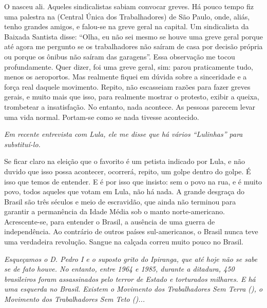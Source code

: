 \normalfont 
O  nasceu ali. Aqueles sindicalistas sabiam convocar
greves. Há pouco tempo fiz uma palestra na  (Central Única dos
Trabalhadores) de São Paulo, onde, aliás, tenho grandes amigos, e
falou-se na greve geral na capital. Um sindicalista da Baixada Santista
disse: ``Olha, eu não sei mesmo se houve uma greve geral porque até
agora me pergunto se os trabalhadores não saíram de casa por decisão
própria ou porque os ônibus não saíram das garagens''. Essa observação
me tocou profundamente. Quer dizer, foi uma greve geral, sim: parou
praticamente tudo, menos os aeroportos. Mas realmente fiquei em dúvida
sobre a sinceridade e a força real daquele movimento. Repito, não
escasseiam razões para fazer greves gerais, e muito mais que isso, para
realmente mostrar o protesto, exibir a queixa, trombetear a
insatisfação. No entanto, nada acontece. As pessoas parecem levar uma
vida normal. Portam-se como se nada tivesse acontecido.

\itshape
Em recente entrevista com Lula, ele me disse que há
vários ``Lulinhas'' para substituí-lo.

\normalfont 
Se ficar claro na eleição que o favorito é um petista
indicado por Lula, e não duvido que isso possa acontecer, ocorrerá,
repito, um golpe dentro do golpe. É isso que temos de entender. E é por
isso que insisto: sem o povo na rua, e é muito povo, todos aqueles que
votam em Lula, não há nada. A grande desgraça do Brasil são três séculos
e meio de escravidão, que ainda não terminou para garantir a permanência
da Idade Média sob o manto norte-americano. Acrescente-se, para entender
o Brasil, a ausência de uma guerra de independência. Ao contrário de
outros países sul-americanos, o Brasil nunca teve uma verdadeira
revolução. Sangue na calçada correu muito pouco no Brasil.

\itshape
Esqueçamos o D. Pedro I e o suposto grito do Ipiranga,
que até hoje não se sabe se de fato houve. No entanto, entre 1964 e
1985, durante a ditadura, 450 brasileiros foram assassinados pelo terror
de Estado e torturados milhares. E há uma esquerda no Brasil. Existem o
Movimento dos Trabalhadores Sem Terra (), o Movimento dos
Trabalhadores Sem Teto ()...

